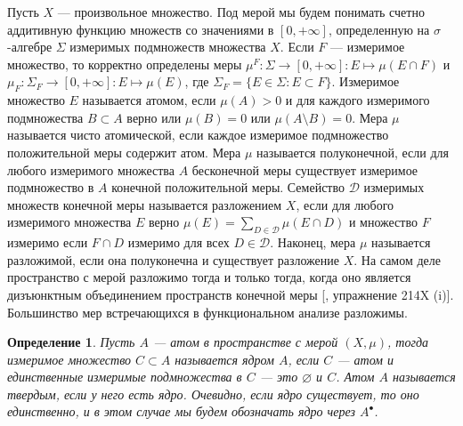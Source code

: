 \documentclass[12pt]{article}
\numberwithin{equation}{subsection}
\theoremstyle{plain}
\newtheorem{definition}{Определение}
\begin{document}
\begin{fulltext}
    Пусть $X$ --- произвольное множество. Под мерой мы будем понимать счетно
    аддитивную функцию множеств со значениями в $[0,+\infty]$, определенную на
    $\sigma$-алгебре $\Sigma$ измеримых подмножеств множества $X$. Если $F$ ---
    измеримое множество, то корректно определены меры
    $\mu^F:\Sigma\to[0,+\infty]:E\mapsto \mu(E\cap F)$ и
    $\mu_F:\Sigma_F\to[0,+\infty]: E\mapsto \mu(E)$, где
    $\Sigma_F=\{E\in\Sigma:E\subset F\}$. Измеримое множество $E$ называется
    атомом, если $\mu(A)>0$ и для каждого измеримого подмножества $B\subset A$
    верно или $\mu(B)=0$ или $\mu(A\setminus B)=0$. Мера $\mu$ называется чисто
    атомической, если каждое измеримое подмножество положительной меры содержит
    атом. Мера $\mu$ называется полуконечной, если для любого измеримого
    множества $A$ бесконечной меры существует измеримое подмножество в $A$
    конечной положительной меры. Семейство $\mathcal{D}$ измеримых множеств
    конечной меры называется разложением $X$, если для любого измеримого
    множества $E$ верно $\mu(E)=\sum_{D\in\mathcal{D}}\mu(E\cap D)$ и множество
    $F$ измеримо если $F\cap D$ измеримо для всех $D\in\mathcal{D}$. Наконец,
    мера $\mu$ называется разложимой, если она полуконечна и существует
    разложение $X$. На самом деле пространство с мерой разложимо тогда и только
    тогда, когда оно является дизъюнктным объединением пространств конечной меры
    [\cite{FremMeasTh2}, упражнение 214X (i)]. Большинство мер встречающихся в
    функциональном анализе разложимы.

    \begin{definition}\label{AtomCore} Пусть $A$ --- атом в пространстве с мерой
        $(X,\mu)$, тогда измеримое множество $C\subset A$ называется ядром $A$,
        если $C$ --- атом и единственные измеримые подмножества в $C$ --- это
        $\varnothing$ и $C$. Атом $A$ называется твердым, если у него есть ядро.
        Очевидно, если ядро существует, то оно единственно, и в этом случае мы
        будем обозначать ядро через $A^\bullet$.
    \end{definition}


\end{fulltext}
\end{document}
